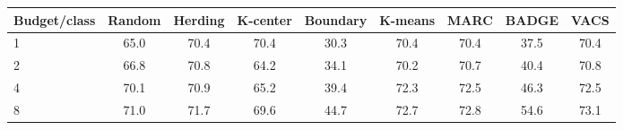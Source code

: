 \begin{tabular}{lcccccccc}
\toprule
Budget/class & Random & Herding & K-center & Boundary & K-means & MARC & BADGE & VACS \\
\midrule
1 & 65.0 & 70.4 & 70.4 & 30.3 & 70.4 & 70.4 & 37.5 & 70.4 \\
2 & 66.8 & 70.8 & 64.2 & 34.1 & 70.2 & 70.7 & 40.4 & 70.8 \\
4 & 70.1 & 70.9 & 65.2 & 39.4 & 72.3 & 72.5 & 46.3 & 72.5 \\
8 & 71.0 & 71.7 & 69.6 & 44.7 & 72.7 & 72.8 & 54.6 & 73.1 \\
\bottomrule
\end{tabular}
